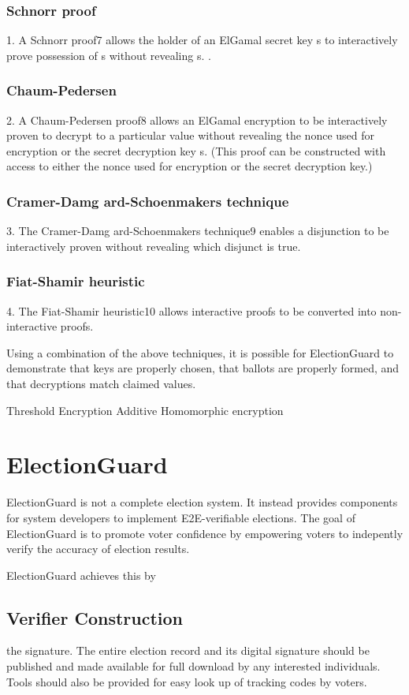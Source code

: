 \subsubsection{Schnorr proof}
1. A Schnorr proof7 allows the holder of an ElGamal
secret key s to interactively prove possession of s without revealing s. \cite[6]{eg-spec}.
\subsubsection{Chaum-Pedersen}
2. A Chaum-Pedersen proof8 allows an ElGamal
encryption to be interactively proven to decrypt to a particular value without revealing the nonce used for encryption
or the secret decryption key s. (This proof can be constructed with access to either the nonce used for encryption or
the secret decryption key.) \cite[6]{eg-spec}
\subsubsection{Cramer-Damg ard-Schoenmakers technique}
3. The Cramer-Damg ard-Schoenmakers technique9 enables a disjunction to be interactively
proven without revealing which disjunct is true.
\subsubsection{Fiat-Shamir heuristic}
4. The Fiat-Shamir heuristic10 allows interactive proofs to be
converted into non-interactive proofs. \cite[6]{eg-spec}

Using a combination of the above techniques, it is possible for ElectionGuard to
demonstrate that keys are properly chosen, that ballots are properly formed, and that decryptions match claimed values.
\cite[6]{eg-spec}

Threshold Encryption
Additive Homomorphic encryption


\section{ElectionGuard}


ElectionGuard is not a complete election system. It instead provides components for system developers to implement
E2E-verifiable elections. The goal of ElectionGuard is to promote voter confidence by empowering voters to
indepently verify the accuracy of election results. \cite[1]{eg-spec}



ElectionGuard achieves this by

\subsection{Verifier Construction}
the signature. The entire election record and its digital signature should be
\cite[25]{eg-spec}
published and made available for full download by any interested individuals. Tools should also be provided for easy
look up of tracking codes by voters.
\cite[25]{eg-spec}

